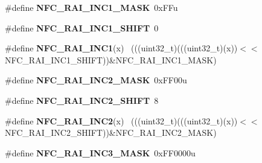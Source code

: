\begin{DoxyCompactItemize}
\item 
\hypertarget{group___n_f_c___register___masks_ga2f5c89b08fa90206304918b5082dbb5e}{}\#define {\bfseries N\+F\+C\+\_\+\+R\+A\+I\+\_\+\+I\+N\+C1\+\_\+\+M\+A\+S\+K}~0x\+F\+Fu\label{group___n_f_c___register___masks_ga2f5c89b08fa90206304918b5082dbb5e}

\item 
\hypertarget{group___n_f_c___register___masks_ga1e7afc53e5223c76f1c89e053f7bcbab}{}\#define {\bfseries N\+F\+C\+\_\+\+R\+A\+I\+\_\+\+I\+N\+C1\+\_\+\+S\+H\+I\+F\+T}~0\label{group___n_f_c___register___masks_ga1e7afc53e5223c76f1c89e053f7bcbab}

\item 
\hypertarget{group___n_f_c___register___masks_gaf4e9dfdfd5812fa071bf3c9aa08949ac}{}\#define {\bfseries N\+F\+C\+\_\+\+R\+A\+I\+\_\+\+I\+N\+C1}(x)                                                ~(((uint32\+\_\+t)(((uint32\+\_\+t)(x))$<$$<$N\+F\+C\+\_\+\+R\+A\+I\+\_\+\+I\+N\+C1\+\_\+\+S\+H\+I\+F\+T))\&N\+F\+C\+\_\+\+R\+A\+I\+\_\+\+I\+N\+C1\+\_\+\+M\+A\+S\+K)\label{group___n_f_c___register___masks_gaf4e9dfdfd5812fa071bf3c9aa08949ac}

\item 
\hypertarget{group___n_f_c___register___masks_ga0a500f6552a0402d6cb6b150d2da3c77}{}\#define {\bfseries N\+F\+C\+\_\+\+R\+A\+I\+\_\+\+I\+N\+C2\+\_\+\+M\+A\+S\+K}~0x\+F\+F00u\label{group___n_f_c___register___masks_ga0a500f6552a0402d6cb6b150d2da3c77}

\item 
\hypertarget{group___n_f_c___register___masks_ga5206e0b2dedd851cc3a10a02cf07c560}{}\#define {\bfseries N\+F\+C\+\_\+\+R\+A\+I\+\_\+\+I\+N\+C2\+\_\+\+S\+H\+I\+F\+T}~8\label{group___n_f_c___register___masks_ga5206e0b2dedd851cc3a10a02cf07c560}

\item 
\hypertarget{group___n_f_c___register___masks_gafe4d9f5b1e0d43c40b1ca4393a732ad0}{}\#define {\bfseries N\+F\+C\+\_\+\+R\+A\+I\+\_\+\+I\+N\+C2}(x)                                                ~(((uint32\+\_\+t)(((uint32\+\_\+t)(x))$<$$<$N\+F\+C\+\_\+\+R\+A\+I\+\_\+\+I\+N\+C2\+\_\+\+S\+H\+I\+F\+T))\&N\+F\+C\+\_\+\+R\+A\+I\+\_\+\+I\+N\+C2\+\_\+\+M\+A\+S\+K)\label{group___n_f_c___register___masks_gafe4d9f5b1e0d43c40b1ca4393a732ad0}

\item 
\hypertarget{group___n_f_c___register___masks_gac0f12698c9f554a7104a3b7f1147ef35}{}\#define {\bfseries N\+F\+C\+\_\+\+R\+A\+I\+\_\+\+I\+N\+C3\+\_\+\+M\+A\+S\+K}~0x\+F\+F0000u\label{group___n_f_c___register___masks_gac0f12698c9f554a7104a3b7f1147ef35}


\end{DoxyCompactItemize}
